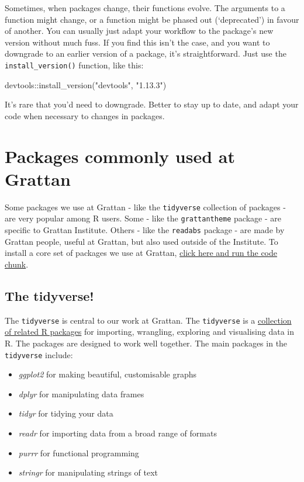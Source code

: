 \documentclass[
]{book}
\newenvironment{Shaded}{\begin{snugshade}}{\end{snugshade}}
\newcommand{\FunctionTok}[1]{\textcolor[rgb]{0.00,0.00,0.00}{#1}}
\newcommand{\NormalTok}[1]{#1}
\newcommand{\SpecialCharTok}[1]{\textcolor[rgb]{0.00,0.00,0.00}{#1}}
\newcommand{\StringTok}[1]{\textcolor[rgb]{0.31,0.60,0.02}{#1}}
\providecommand{\tightlist}{%
  \setlength{\itemsep}{0pt}\setlength{\parskip}{0pt}}
\begin{document}
Sometimes, when packages change, their functions evolve. The arguments to a function might change, or a function might be phased out (`deprecated') in favour of another. You can usually just adapt your workflow to the package's new version without much fuss. If you find this isn't the case, and you want to downgrade to an earlier version of a package, it's straightforward. Just use the \texttt{install\_version()} function, like this:

\begin{Shaded}
\begin{Highlighting}[]
\NormalTok{devtools}\SpecialCharTok{::}\FunctionTok{install\_version}\NormalTok{(}\StringTok{"devtools"}\NormalTok{, }\StringTok{"1.13.3"}\NormalTok{)}
\end{Highlighting}
\end{Shaded}

It's rare that you'd need to downgrade. Better to stay up to date, and adapt your code when necessary to changes in packages.

\hypertarget{packages-commonly-used-at-grattan}{%
\chapter{Packages commonly used at Grattan}\label{packages-commonly-used-at-grattan}}

Some packages we use at Grattan - like the \texttt{tidyverse} collection of packages - are very popular among R users. Some - like the \texttt{grattantheme} package - are specific to Grattan Institute. Others - like the \texttt{readabs} package - are made by Grattan people, useful at Grattan, but also used outside of the Institute. To install a core set of packages we use at Grattan, \protect\hyperlink{install-grattan-packages}{click here and run the code chunk}.

\hypertarget{tidyverse}{%
\section{The tidyverse!}\label{tidyverse}}

The \texttt{tidyverse} is central to our work at Grattan. The \texttt{tidyverse} is a \href{https://www.tidyverse.org/packages/}{collection of related R packages} for importing, wrangling, exploring and visualising data in R. The packages are designed to work well together.
The main packages in the \texttt{tidyverse} include:

\begin{itemize}
\tightlist
\item
  \emph{ggplot2} for making beautiful, customisable graphs
\item
  \emph{dplyr} for manipulating data frames
\item
  \emph{tidyr} for tidying your data
\item
  \emph{readr} for importing data from a broad range of formats
\item
  \emph{purrr} for functional programming
\item
  \emph{stringr} for manipulating strings of text
\end{itemize}
\end{document}
